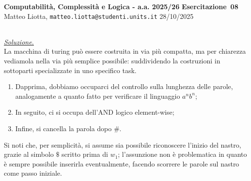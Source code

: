 \documentclass[a4paper,10pt]{article}
\makeatletter
\newcommand{\EsercitazioneNum}{08}
\newcommand{\Data}{28/10/2025}
\newcommand{\DocType}{Esercitazione} %
\newcommand{\FullTitle}{\DocType\ \EsercitazioneNum}
\newcommand{\Header}{
\noindent
  \small \textbf{Computabilità, Complessità e Logica - a.a. 2025/26} \hfill \textbf{\FullTitle} \\[0.2cm]
  \scriptsize Matteo Liotta, \texttt{matteo.liotta@studenti.units.it} \hfill \Data \\[0.2cm]
  \noindent\makebox[\linewidth]{\rule{\linewidth}{0.4pt}} \\[0.3cm]}
\newcommand{\NewPageHeader}{
  \vfill
  \noindent\makebox[\linewidth]{\rule{\linewidth}{0.4pt}}
  \newpage
  {\Header}
}
\makeatother
\begin{document}
{\begin{itemize}[label=, leftmargin=0pt]
    \NewPageHeader
    
    \begin{osservazioni}
        \underline{\textit{Soluzione.}}\\
        La macchina di turing può essere costruita in via più compatta, ma per chiarezza vediamola nella via più semplice possibile: suddividendo la costruzioni in sottoparti specializzate in uno specifico task.
        \begin{enumerate}
            \item Dapprima, dobbiamo occuparci del controllo sulla lunghezza delle parole, analogamente a quanto fatto per verificare il linguaggio $a^nb^n$;
            \item In seguito, ci si occupa dell'AND logico element-wise;
            \item Infine, si cancella la parola dopo $\#$.
        \end{enumerate}
        Si noti che, per semplicità, si assume sia possibile riconoscere l'inizio del nastro, grazie al simbolo $\$$ scritto prima di $w_1$; l'assunzione non è problematica in quanto è sempre possibile inserirla eventualmente, facendo scorrere le parole sul nastro come passo iniziale.\\

        \begin{center}
\end{center}
\end{osservazioni}
\end{itemize}}
\end{document}
